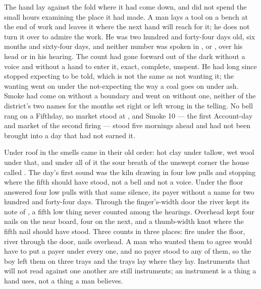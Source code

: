
The hand lay against the fold where it had come down, and  did not spend the small hours examining the place it had made. A man lays a tool on a bench at the end of work and leaves it where the next hand will reach for it; he does not turn it over to admire the work. He was two hundred and forty-four days old, six months and sixty-four days, and neither number was spoken in ,  or , over his head or in his hearing. The count had gone forward out of the dark without a voice and without a hand to enter it, exact, complete, unspent. He had long since stopped expecting to be told, which is not the same as not wanting it; the wanting went on under the not-expecting the way a coal goes on under ash. Smoke had come on without a boundary and went on without one, neither of the district's two names for the months set right or left wrong in the telling. No bell rang on a Fifthday, no market stood at , and Smoke 10 --- the first Account-day and market of the second firing --- stood five mornings ahead and had not been brought into a day that had not earned it.

Under  roof in  the smells came in their old order: hot clay under tallow, wet wool under that, and under all of it the sour  breath of the unswept corner the house called . The day's first sound was the kiln drawing in four low pulls and stopping where the fifth should have stood, not a bell and not a voice. Under the floor  answered four low pulls with that same silence, its payer without a name for two hundred and forty-four days. Through the finger's-width door the river kept its note of , a fifth low thing never counted among the hearings. Overhead  kept four nails on the near board, four on the next, and a thumb-width knot where the fifth nail should have stood. Three counts in three places: fire under the floor, river through the door, nails overhead. A man who wanted them to agree would have to put a payer under every one, and no payer stood to any of them, so the boy left them on three trays and the trays lay where they lay. Instruments that will not read against one another are still instruments; an instrument is a thing a hand uses, not a thing a man believes.

